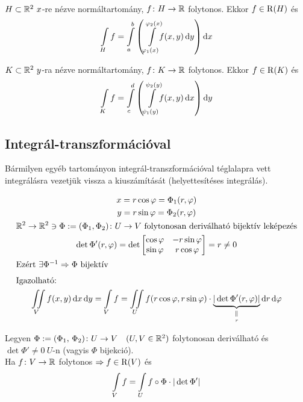 \begin{te}\ 
  \begin{enumzjb}
    \item $H\subset \mathbb{R}^2\ x$-re nézve normáltartomány, $f\colon H\to\mathbb{R}$  folytonos. Ekkor $f\in\operatorname{R}(H)$ és
      \[\Int_Hf=\Int_a^b\left(\Int_{\vfi_1(x)}^{\vfi_2(x)}\!\!f(x,y)\diff y\right)\diff x\]
    \item $K\subset \mathbb{R}^2\ y$-ra nézve normáltartomány, $f\colon K\to\mathbb{R}$  folytonos. Ekkor $f\in\operatorname{R}(K)$ és
      \[\Int_Kf=\Int_c^d\left(\Int_{\psi_1(y)}^{\psi_2(y)}\!\!f(x,y)\diff x\right)\diff y\]
  \end{enumzjb}
\end{te}

\subsection{Integrál-transzformációval}
Bármilyen egyéb tartományon integrál-transzformációval téglalapra vett integrálásra vezetjük vissza a kiuszámítását
(helyettesítéses integrálás).

\begin{pl}
\begin{gather*}
  x=r\cos\vfi=\Phi_1(r,\vfi)\\
  y=r\sin\vfi=\Phi_2(r,\vfi)\\
  \R^2\to\R^2\owns\Phi:=(\Phi_1,\Phi_2)\colon U\to V\text{ folytonosan deriválható bijektív leképezés}\\
  \det\Phi'(r,\vfi)=\det\begin{bmatrix}\cos\vfi & -r\sin\vfi\\\sin\vfi & r\cos\vfi\end{bmatrix} = r \ne 0\\
  \intertext{Ezért $\exists\Phi^{-1}\nn \Phi$  bijektív}
  \intertext{Igazolható:}
  \iint\limits_Vf(x,y)\diff x\diff y=\Int_V f=\iint\limits_U f(r\cos\vfi,r\sin\vfi)\cdot\underbrace{
  \vert\det\Phi'(r,\vfi)\vert }_{\underset{r}{\scriptsize{\Vert}}}\diff r\diff \vfi  
\end{gather*}
\end{pl}
\begin{te}
  Legyen $\Phi:=(\Phi_1,\,\Phi_2)\colon U\to V\quad (U,V\in\mathbb{R}^2)$ folytonosan deriválható és $\det\Phi' \ne0\ U$-n
  (vagyis $\Phi$ bijekció).\\
  Ha  $f\colon V\to\mathbb{R}$ folytonos $\Rightarrow f\in\operatorname{R}(V)$ és
  \[\Int_Vf=\Int_Uf\circ\Phi\cdot\vert\det\Phi'\vert\]
\end{te}


